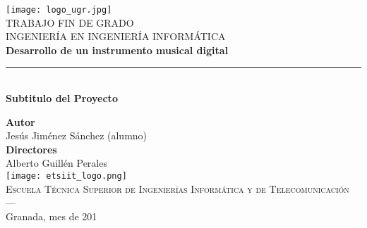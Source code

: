 \begin{titlepage}
 
 
\newlength{\centeroffset}
\setlength{\centeroffset}{-0.5\oddsidemargin}
\addtolength{\centeroffset}{0.5\evensidemargin}
\thispagestyle{empty}

\noindent\hspace*{\centeroffset}\begin{minipage}{\textwidth}

\centering
\texttt{[image: logo\_ugr.jpg]}\\[1.4cm]

\textsc{ \Large TRABAJO FIN DE GRADO\\[0.2cm]}
\textsc{ INGENIERÍA EN INGENIERÍA INFORMÁTICA}\\[1cm]
% 
{\Huge\bfseries Desarrollo de un instrumento musical digital\\
}
\noindent\rule[-1ex]{\textwidth}{3pt}\\[3.5ex]
{\large\bfseries Subtitulo del Proyecto}
\end{minipage}

\vspace{2.5cm}
\noindent\hspace*{\centeroffset}\begin{minipage}{\textwidth}
\centering

\textbf{Autor}\\ { Jesús Jiménez Sánchez (alumno) }\\[2.5ex]
\textbf{Directores}\\
{ Alberto Guillén Perales \\[2cm] }
\texttt{[image: etsiit\_logo.png]}\\[0.1cm]
\textsc{Escuela Técnica Superior de Ingenierías Informática y de Telecomunicación}\\
\textsc{---}\\
Granada, mes de 201
\end{minipage}

\end{titlepage}


